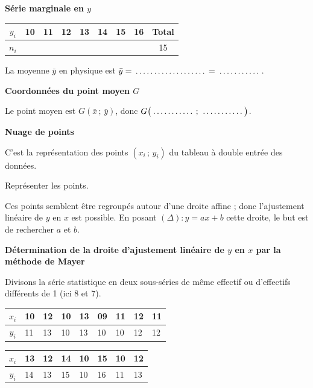 \documentclass[11pt,a4paper]{article}
\newcommand{\blanc}[1][1.8cm]{\makebox[#1]{\dotfill}}
\newcommand{\rubrique}[1]{\par\medskip\noindent\textbf{#1}\par\smallskip}
\begin{document}
\rubrique{Série marginale en $y$}

\begin{center}
  \begin{tabular}{|c|*{7}{C{0.8cm}|}c|}
    \hline
    $y_i$ & 10 & 11 & 12 & 13 & 14 & 15 & 16 & Total\\ \hline
    $n_i$ & & & & & & & & 15\\ \hline
  \end{tabular}
\end{center}
La moyenne $\bar{y}$ en physique est
$\bar{y} = \blanc[3cm] = \blanc$.

\rubrique{Coordonnées du point moyen $G$}

Le point moyen est $G(\bar{x}\,;\,\bar{y})$, donc
$G\bigl(\blanc\,;\,\blanc\bigr)$.

\rubrique{Nuage de points}

C'est la représentation des points $(x_i\,;\,y_i)$ du tableau à double entrée
des données.

Représenter les points.


Ces points semblent être regroupés autour d'une droite affine ; donc
l'ajustement linéaire de $y$ en $x$ est possible. En posant
$(\Delta) : y = ax + b$ cette droite, le but est de rechercher $a$ et $b$.

\rubrique{Détermination de la droite d'ajustement linéaire de $y$ en $x$ par la
méthode de Mayer}

Divisons la série statistique en deux sous-séries de même effectif ou
d'effectifs différents de 1 (ici 8 et 7).

\begin{center}
  \small
  \setlength{\tabcolsep}{4pt}
  \begin{tabular}{|c|*{8}{C{0.55cm}|}}
    \hline
    $x_i$ & 10 & 12 & 10 & 13 & 09 & 11 & 12 & 11\\ \hline
    $y_i$ & 11 & 13 & 10 & 13 & 10 & 10 & 12 & 12\\ \hline
  \end{tabular}
  \hfill
  \begin{tabular}{|c|*{7}{C{0.55cm}|}}
    \hline
    $x_i$ & 13 & 12 & 14 & 10 & 15 & 10 & 12\\ \hline
    $y_i$ & 14 & 13 & 15 & 10 & 16 & 11 & 13\\ \hline
  \end{tabular}
\end{center}
\end{document}
